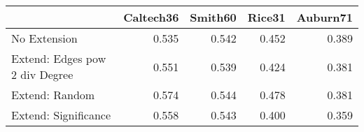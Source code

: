 \begin{tabular}{lrrrr}
\toprule
{} & Caltech36 & Smith60 & Rice31 & Auburn71 \\
\midrule
No Extension                   &     0.535 &   0.542 &  0.452 &    0.389 \\
Extend: Edges pow 2 div Degree &     0.551 &   0.539 &  0.424 &    0.381 \\
Extend: Random                 &     0.574 &   0.544 &  0.478 &    0.381 \\
Extend: Significance           &     0.558 &   0.543 &  0.400 &    0.359 \\
\bottomrule
\end{tabular}
